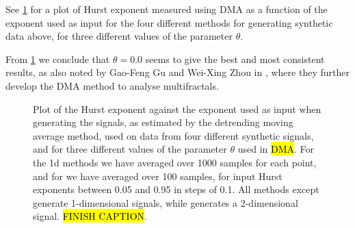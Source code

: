 See \cref{fig:dma_performace} for a plot of Hurst exponent measured using DMA as a function of the exponent used as input for the four different methods for generating synthetic data above, for three different values of the parameter $\theta$.

From \cref{fig:dma_performace} we conclude that $\theta = 0.0$ seems to give the best and most consistent results, as also noted by Gao-Feng Gu and Wei-Xing Zhou in \cite{gu2010detrending}, where they further develop the DMA method to analyse multifractals. %
%
\begin{figure}[htpb]%
    \centering%
    {
        \newcommand{\f}{\footnotesize}%
        \newcommand{\x}{\text}%
        \newcommand{\thislabelaaaaaa}{{\f $H_\x{in}=H_\x{out}$}}%
    }
    \caption{%
        Plot of the Hurst exponent against the exponent used as input when generating the signals, as estimated by the detrending moving average method, used on data from four different synthetic signals, and for three different values of the parameter $\theta$ used in \hl{DMA}. For the 1d methods we have averaged over 1000 samples for each point, and for  we have averaged over 100 samples, for input Hurst exponents between 0.05 and 0.95 in steps of 0.1. All methods except  generate 1-dimensional signals, while  generates a 2-dimensional signal. \hl{FINISH CAPTION}. %
        \label{fig:dma_performace}%
    }%
\end{figure}%
%
